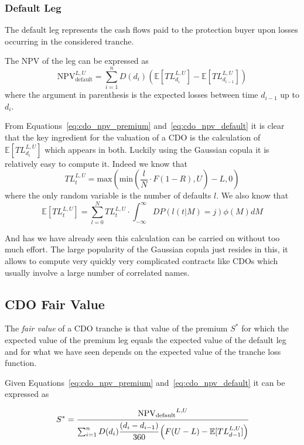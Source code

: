 \subsubsection{Default Leg}
The default leg represents the cash flows paid to the protection buyer upon losses occurring in the considered tranche. 

The NPV of the leg can be expressed as
\begin{equation}
\mathrm{NPV}_{\mathrm{default}}^{L,U}=\sum_{i=1}^{n}D(d_i)\left(\mathbb{E}[TL_{d_i}^{L,U}]-\mathbb{E}[TL_{d_{i-1}}^{L,U}]\right)
\label{eq:cdo_npv_default}
\end{equation}
where the argument in parenthesis is the expected losses between time $d_{i-1}$ up to $d_i$. 

From Equations~\ref{eq:cdo_npv_premium} and~\ref{eq:cdo_npv_default} it is clear that the key ingredient for the valuation of a CDO is the calculation of $\mathbb{E}[TL_{d_i}^{L,U}]$ which appears in both. Luckily using the Gaussian copula it is relatively easy to compute it. Indeed we know that 
\begin{equation}
TL_{t}^{L,U}=\mathrm{max}(\mathrm{min}(\frac{l}{N}\cdot F(1-R), U)-L, 0)
\label{eq:tl}
\end{equation}
where the only random variable is the number of defaults $l$. We also know that 
\begin{equation}
\mathbb{E}[TL_{t}^{L,U}] = \sum_{l=0}^{N}TL_{t}^{L,U}\cdot \int_{-\infty}^{\infty} DP(l(t|M)=j) \phi(M)dM
\label{eq:etl}
\end{equation}

And has we have already seen this calculation can be carried on without too much effort. The large popularity of the Gaussian copula just resides in this, it allows to compute very quickly very complicated contracts like CDOs which usually involve a large number of correlated names.

\subsection{CDO Fair Value}
The \emph{fair value} of a CDO tranche is that value of the premium $S^*$ for which the expected value of the premium leg equals the expected value of the default leg and for what we have seen depends on the expected value of the tranche loss function.

Given Equations~\ref{eq:cdo_npv_premium} and~\ref{eq:cdo_npv_default} it can be expressed as

\begin{equation}
S^* = \cfrac{\mathrm{NPV_{default}}^{L,U}}{\sum^{n}_{i=1}D(d_i)\cfrac{(d_i - d_{i-1})}{360}\left(F(U-L)-\mathbb{E}[TL_{d-1}^{L,U}]\right)}
\label{eq:cdo_fair_value}
\end{equation}

